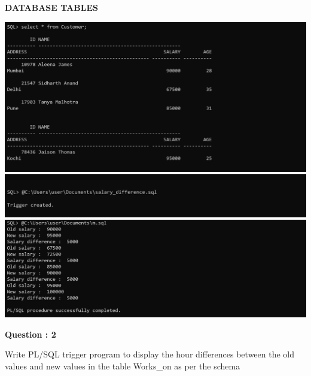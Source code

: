 \documentclass[a4paper,12pt]{report}
\begin{document}
\begin{flushleft}
\textbf{DATABASE TABLES}
\end{flushleft}
\includegraphics[scale=0.4]{T1A.png}
\includegraphics[scale=0.415]{T1B.png}
\includegraphics[scale=0.4]{T1C.png}
\begin{flushleft}
    \textbf{Question : 2}
\end{flushleft}
Write PL/SQL trigger program to display the hour differences between the old values and new values in the table Works\_on as per the schema
\end{document}
